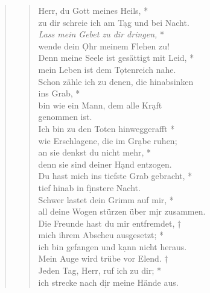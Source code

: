 \vspace{0.3cm}
\def\greinitialformat#1{{\fontsize{40}{40}\selectfont #1}}
\gresetfirstlineaboveinitial{\small \textcolor{red}{Ps 88}}{}
\setaboveinitialseparation{0.72mm}

\vspace{0.3cm}

\begin{quote}
 


\begin{verse}
 Herr, du Gott meines Heils, *\\
zu dir schreie ich am T\d ag und bei Nacht.\\ \vin  
\textit{Lass mein Gebet zu dir dringen,} *\\ \vin 
wende dein \d Ohr meinem Flehen zu!\\ 
Denn meine Seele ist gesättigt mit Leid, *\\
mein Leben ist dem T\d otenreich nahe.\\ \vin  
Schon zähle ich zu denen, die hinabsinken \\ \vin ins Grab, *\\ \vin 
bin wie ein Mann, dem alle Kr\d aft \\ \vin genommen ist.\\ 
Ich bin zu den Toten hinweggerafft *\\
wie Erschlagene, die im Gr\d abe ruhen;\\
\vin an sie denkst du nicht mehr, *\\ 
\vin denn sie sind deiner H\d and entzogen.\\  
Du hast mich ins tiefste Grab gebracht, *\\ 
tief hinab in f\d instere Nacht.\\
 \vin Schwer lastet dein Grimm auf mir, *\\
 \vin all deine Wogen stürzen über m\d ir zusammen.\\   
Die Freunde hast du mir entfremdet, †\\  
mich ihrem Abscheu ausgesetzt; *\\  ich bin gefangen und k\d ann nicht heraus.\\ 
\vin Mein Auge wird trübe vor Elend.  †\\
\vin Jeden Tag, Herr, ruf ich zu dir; *\\ \vin ich strecke nach d\d ir meine Hände aus.\\

\end{verse}
\end{quote}

